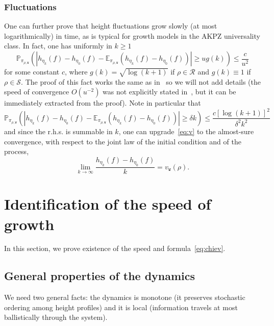 \documentclass[AHL,Unicode,longabstracts,published]{cedram}
\newcommand{\ttw}{\mathtt{w}}
\newcommand{\bbE}{\mathbb{E}}
\newcommand{\bbP}{\mathbb{P}}
\newcommand{\clS}{\mathcal{S}}
\newcommand{\clR}{\mathcal{R}}
\newcommand{\ttw}{\mathtt{w}}
\begin{document}
\subsubsection{Fluctuations}\label{sec:fluct}
One can further prove that height fluctuations grow slowly (at most logarithmically) in time, as is typical for growth models in the AKPZ universality class. In fact, one has uniformly in $k\ge 1$
\[
\bbP_{\pi_{\rho,\ttw}}\left(\left|h_{\eta_k}(f)-h_{\eta_0}(f) -\bbE_{\pi_{\rho,\ttw}} \left(h_{\eta_k}(f)-h_{\eta_0}(f)\right)\right|\ge u g(k)\right)\le \frac{c}{u^2}
\]
for some constant $c$, where $g(k)=\sqrt{\log(k+1)}$ if $\rho\in\clR$ and $g(k)\equiv 1$ if $\rho\in\clS$. The proof of this fact works the same as in~\cite{CT:18} so we will not add details (the speed of convergence $O(u^{-2})$ was not explicitly stated in~\cite{CT:18}, but it can be immediately extracted from the proof). Note in particular that
\begin{equation}\label{eq:nip}
\bbP_{\pi_{\rho,\ttw}}\left(\left|h_{\eta_k}(f)-h_{\eta_0}(f) -\bbE_{\pi_{\rho,\ttw}} \left(h_{\eta_k}(f)-h_{\eta_0}(f)\right)\right|\ge \delta k\right)\le \frac{c [\log (k+1)]^2}{\delta^2k^2}
\end{equation}
and since the r.h.s. is summable in $k$, one can upgrade~\eqref{eq:v} to the almost-sure convergence, with respect to the joint law of the initial condition and of the process,
\begin{equation}\label{eq:asc}
\lim_{k\to\infty}\frac{h_{\eta_{k}}(f)-h_{\eta_{0}}(f)}k=v_{\ttw}(\rho).
\end{equation}


\section{Identification of the speed of growth} \label{sec:Identification}
\label{sec:proofs}


In this section, we prove existence of the speed and formula~\eqref{eq:chiev}.

\pagebreak
\subsection{General properties of the dynamics}\label{sec:Aztecodyn}

We need two general facts: the dynamics is monotone (it preserves stochastic ordering among height profiles) and it is local (information travels at most ballistically through the system).
\end{document}
